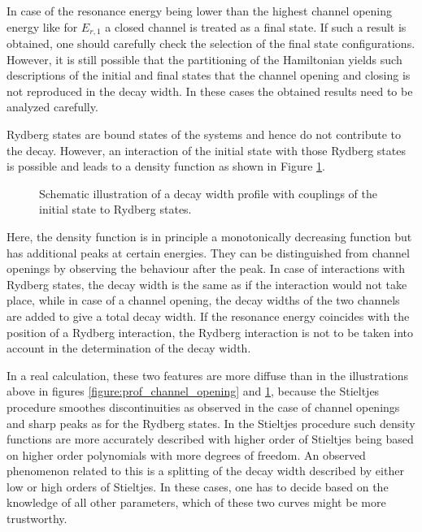 In case of the resonance energy being lower than the highest channel
opening energy like for $E_{r,1}$ a closed channel is treated as a final
state. If such a result is obtained, one should carefully check the selection
of the final state configurations. However, it is still possible that the
partitioning of the Hamiltonian yields such descriptions of the initial and
final states that the channel opening and closing is not reproduced in the
decay width. In these cases the obtained results need to be analyzed carefully.

Rydberg states are bound states of the systems and hence do not contribute
to the decay. However, an interaction of the initial state with those
Rydberg states is possible and leads to a density function as shown in
Figure \ref{figure:prof_rydberg}.

\begin{figure}[h]
  \centering
  
  \caption{Schematic illustration of a decay width profile with couplings
           of the initial state to Rydberg states.}
  \label{figure:prof_rydberg}
\end{figure}
Here, the density function is in principle a monotonically decreasing function
but has additional peaks at certain energies. They can be distinguished from
channel openings by observing the behaviour after the peak. In case of
interactions with Rydberg states, the decay width is the same as if the interaction
would not take place, while in case of a channel opening, the decay widths
of the two channels are added to give a total decay width.
If the resonance energy coincides with the position of a Rydberg interaction,
the Rydberg interaction is not to be taken into account in the determination
of the decay width.

In a real calculation, these two features are more diffuse than in the
illustrations above in
figures \ref{figure:prof_channel_opening}
and \ref{figure:prof_rydberg}, because the Stieltjes procedure smoothes
discontinuities as observed in the case of channel openings and sharp peaks
as for the Rydberg states.
In the Stieltjes procedure such density functions are more accurately described
with higher order of Stieltjes being based on higher order polynomials
with more degrees of freedom.
An observed phenomenon related to this is
a splitting of the decay width described by either low or high orders of Stieltjes.
In these cases, one has to decide based on the knowledge of all other
parameters, which of these two curves might be more trustworthy.

